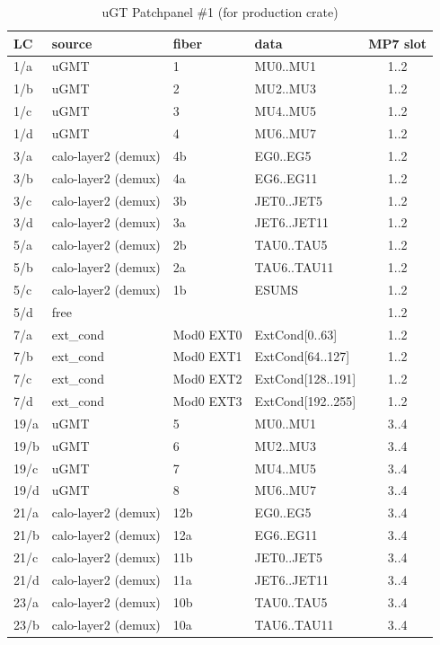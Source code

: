 \begin{longtable}{|l|l|l|l|c|}
\caption{uGT Patchpanel \#1 (for production crate)}
    \label{tab:app:opt_pp_tab_1}\\
\hline
\textbf{LC} & \textbf{source} & \textbf{fiber} & \textbf{data} & \textbf{MP7 slot}\\
\hline
\hline
\endhead
1/a & uGMT & 1 & MU0..MU1 & 1..2\\
1/b & uGMT & 2 & MU2..MU3 & 1..2\\
1/c & uGMT & 3 & MU4..MU5 & 1..2\\
1/d & uGMT & 4 & MU6..MU7 & 1..2\\
3/a & calo-layer2 (demux) & 4b & EG0..EG5 & 1..2\\
3/b & calo-layer2 (demux) & 4a & EG6..EG11 & 1..2\\
3/c & calo-layer2 (demux) & 3b & JET0..JET5 & 1..2\\
3/d & calo-layer2 (demux) & 3a & JET6..JET11 & 1..2\\
5/a & calo-layer2 (demux) & 2b & TAU0..TAU5 & 1..2\\
5/b & calo-layer2 (demux) & 2a & TAU6..TAU11 & 1..2\\
5/c & calo-layer2 (demux) & 1b & ESUMS & 1..2\\
5/d & free &  &  & 1..2\\
7/a & ext\_cond & Mod0 EXT0 & ExtCond[0..63] & 1..2 \\
7/b & ext\_cond & Mod0 EXT1 & ExtCond[64..127] & 1..2\\
7/c & ext\_cond & Mod0 EXT2 & ExtCond[128..191] & 1..2\\
7/d & ext\_cond & Mod0 EXT3 & ExtCond[192..255] & 1..2\\\hline
19/a & uGMT & 5 & MU0..MU1 & 3..4\\
19/b & uGMT & 6 & MU2..MU3 & 3..4\\
19/c & uGMT & 7 & MU4..MU5 & 3..4\\
19/d & uGMT & 8 & MU6..MU7 & 3..4\\
21/a & calo-layer2 (demux) & 12b & EG0..EG5 & 3..4\\       
21/b & calo-layer2 (demux) & 12a & EG6..EG11 & 3..4\\      
21/c & calo-layer2 (demux) & 11b & JET0..JET5 & 3..4\\     
21/d & calo-layer2 (demux) & 11a & JET6..JET11 & 3..4\\    
23/a & calo-layer2 (demux) & 10b & TAU0..TAU5 & 3..4\\     
23/b & calo-layer2 (demux) & 10a & TAU6..TAU11 & 3..4\\    

\end{longtable}
